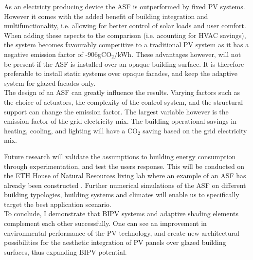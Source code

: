 

As an electricty producing device the ASF is outperformed by fixed PV systems. However it comes with the added benefit of building integration and multifunctionality, i.e. allowing for better control of solar loads and user comfort. When adding these aspects to the comparison (i.e. acounting for HVAC savings), the system becomes favourably competitive to a traditional PV system as it has a negative emission factor of -906gCO${_2}$/kWh. These advantages however, will not be present if the ASF is installed over an opaque building surface. It is therefore preferable to install static systems over opaque facades, and keep the adaptive system for glazed facades only.\\

The design of an ASF can greatly influence the results. Varying factors such as the choice of actuators, the complexity of the control system, and the structural support can change the emission factor. The largest variable however is the emission factor of the grid electricity mix. The building operational savings in heating, cooling, and lighting will have a CO${_2}$ saving based on the grid electricity mix. 


Future research will validate the assumptions to building energy consumption through experimentation, and test the users response. This will be conducted on the ETH House of Natural Resources living lab where an example of an ASF has already been constructed \cite{nagy2016adaptive}. Further numerical simulations of the ASF on different building typologies, building systems and climates will enable us to specifically target the best application scenario. \\

To conclude, I demonstrate that BIPV systems and adaptive shading elements complement each other successfully. One can see an improvement in environmental performance of the PV technology, and create new architectural possibilities for the aesthetic integration of PV panels over glazed building surfaces, thus expanding BIPV potential. 

